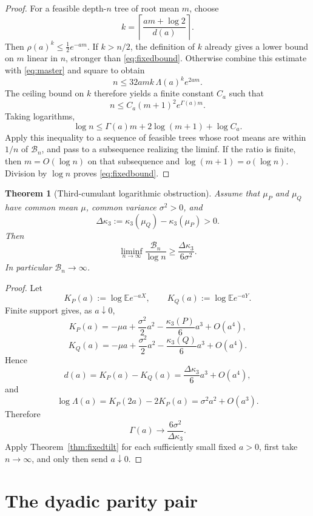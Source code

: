 \documentclass[11pt,a4paper]{article}
\newtheorem{theorem}{Theorem}[section]
\theoremstyle{definition}
\theoremstyle{remark}
\newcommand{\E}{\mathbb E}
\newcommand{\cB}{\mathcal B}
\begin{document}
\begin{proof}
For a feasible depth-\(n\) tree of root mean \(m\), choose
\[
 k=\left\lceil\frac{am+\log2}{d(a)}\right\rceil.
\]
Then \(\rho(a)^k\le\frac12e^{-am}\).  If \(k>n/2\), the definition of
\(k\) already gives a lower bound on \(m\) linear in \(n\), stronger than
\eqref{eq:fixedbound}.  Otherwise combine this estimate with
\eqref{eq:master} and square to obtain
\[
 n\le32amk\,\Lambda(a)^k e^{2am}.
\]
The ceiling bound on \(k\) therefore yields a finite constant \(C_a\) such that
\[
 n\le C_a(m+1)^2e^{\Gamma(a)m}.
\]
Taking logarithms,
\[
 \log n\le\Gamma(a)m+2\log(m+1)+\log C_a.
\]
Apply this inequality to a sequence of feasible trees whose root means are
within \(1/n\) of \(\cB_n\), and pass to a subsequence realizing the liminf.
If the ratio is finite, then \(m=O(\log n)\) on that subsequence and
\(\log(m+1)=o(\log n)\).  Division by \(\log n\) proves
\eqref{eq:fixedbound}.
\end{proof}

\begin{theorem}[Third-cumulant logarithmic obstruction]
\label{thm:third}
Assume that \(\mu_P\) and \(\mu_Q\) have common mean \(\mu\), common variance
\(\sigma^2>0\), and
\[
 \Delta\kappa_3:=\kappa_3(\mu_Q)-\kappa_3(\mu_P)>0.
\]
Then
\begin{equation}
 \boxed{
 \liminf_{n\to\infty}\frac{\cB_n}{\log n}
 \ge\frac{\Delta\kappa_3}{6\sigma^2}.
 }
 \label{eq:third}
\end{equation}
In particular \(\cB_n\to\infty\).
\end{theorem}

\begin{proof}
Let
\[
 K_P(a):=\log\E e^{-aX},
 \qquad
 K_Q(a):=\log\E e^{-aY}.
\]
Finite support gives, as \(a\downarrow0\),
\[
 K_P(a)=-\mu a+\frac{\sigma^2}{2}a^2-\frac{\kappa_3(P)}6a^3+O(a^4),
\]
\[
 K_Q(a)=-\mu a+\frac{\sigma^2}{2}a^2-\frac{\kappa_3(Q)}6a^3+O(a^4).
\]
Hence
\[
 d(a)=K_P(a)-K_Q(a)=\frac{\Delta\kappa_3}{6}a^3+O(a^4),
\]
and
\[
 \log\Lambda(a)=K_P(2a)-2K_P(a)=\sigma^2a^2+O(a^3).
\]
Therefore
\[
 \Gamma(a)\longrightarrow\frac{6\sigma^2}{\Delta\kappa_3}.
\]
Apply Theorem~\ref{thm:fixedtilt} for each sufficiently small fixed \(a>0\),
first take \(n\to\infty\), and only then send \(a\downarrow0\).
\end{proof}

\section{The dyadic parity pair}
\label{sec:dyadic}
\end{document}
